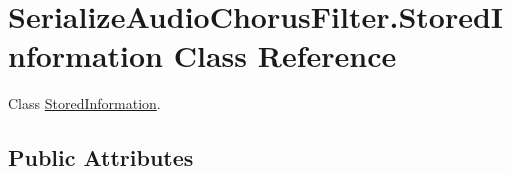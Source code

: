 \hypertarget{class_serialize_audio_chorus_filter_1_1_stored_information}{}\section{Serialize\+Audio\+Chorus\+Filter.\+Stored\+Information Class Reference}
\label{class_serialize_audio_chorus_filter_1_1_stored_information}


Class \hyperlink{class_serialize_audio_chorus_filter_1_1_stored_information}{Stored\+Information}.  


\subsection*{Public Attributes}
